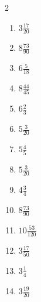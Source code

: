 \documentclass[12pt]{article}
\begin{document}
\begin{multicols}{2}
\begin{enumerate}
\item $ 3 \frac{17}{20} $
\item $ 8 \frac{73}{90} $
\item $ 6 \frac{5}{18} $
\item $ 8 \frac{44}{45} $
\item $ 6 \frac{2}{3} $
\item $ 5 \frac{3}{20} $
\item $ 5 \frac{4}{5} $
\item $ 5 \frac{3}{20} $
\item $ 4 \frac{3}{4} $
\item $ 8 \frac{73}{90} $
\item $ 10 \frac{53}{120} $
\item $ 3 \frac{17}{50} $
\item $ 3 \frac{1}{4} $
\item $ 3 \frac{19}{20} $
\end{enumerate}\end{multicols}\newpage
\end{document}
